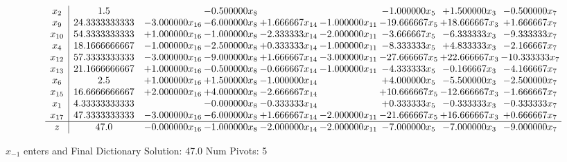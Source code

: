 \documentclass[10pt]{article}
\begin{document}
 \[\begin{array}{c| c c@{\hskip 2pt} c@{\hskip 2pt} c@{\hskip 2pt} c@{\hskip 2pt} c@{\hskip 2pt} c@{\hskip 2pt} c@{\hskip 2pt} }
 x_{2}   &  1.5  &   & -0.500000 x_{8} &    &   & -1.000000 x_{5} & + 1.500000 x_{3} & -0.500000 x_{7}\\
 x_{9}   &  24.3333333333 & -3.000000 x_{16} & -6.000000 x_{8} & + 1.666667 x_{14} & -1.000000 x_{11} & -19.666667 x_{5} & + 18.666667 x_{3} & + 1.666667 x_{7}\\
 x_{10}   &  54.3333333333 & + 1.000000 x_{16} & -1.000000 x_{8} & -2.333333 x_{14} & -2.000000 x_{11} & -3.666667 x_{5} & -6.333333 x_{3} & -9.333333 x_{7}\\
 x_{4}   &  18.1666666667 & -1.000000 x_{16} & -2.500000 x_{8} & + 0.333333 x_{14} & -1.000000 x_{11} & -8.333333 x_{5} & + 4.833333 x_{3} & -2.166667 x_{7}\\
 x_{12}   &  57.3333333333 & -3.000000 x_{16} & -9.000000 x_{8} & + 1.666667 x_{14} & -3.000000 x_{11} & -27.666667 x_{5} & + 22.666667 x_{3} & -10.333333 x_{7}\\
 x_{13}   &  21.1666666667 & + 1.000000 x_{16} & -0.500000 x_{8} & -0.666667 x_{14} & -1.000000 x_{11} & -4.333333 x_{5} & -0.166667 x_{3} & -4.166667 x_{7}\\
 x_{6}   &  2.5 & + 1.000000 x_{16} & + 1.500000 x_{8} & -1.000000 x_{14} &   & + 4.000000 x_{5} & -5.500000 x_{3} & -2.500000 x_{7}\\
 x_{15}   &  16.6666666667 & + 2.000000 x_{16} & + 4.000000 x_{8} & -2.666667 x_{14} &   & + 10.666667 x_{5} & -12.666667 x_{3} & -1.666667 x_{7}\\
 x_{1}   &  4.33333333333  &   & -0.000000 x_{8} & -0.333333 x_{14} &   & + 0.333333 x_{5} & -0.333333 x_{3} & -0.333333 x_{7}\\
 x_{17}   &  47.3333333333 & -3.000000 x_{16} & -6.000000 x_{8} & + 1.666667 x_{14} & -2.000000 x_{11} & -21.666667 x_{5} & + 16.666667 x_{3} & + 0.666667 x_{7}\\
\hline
z    &  47.0 & -0.000000 x_{16} & -1.000000 x_{8} & -2.000000 x_{14} & -2.000000 x_{11} & -7.000000 x_{5} & -7.000000 x_{3} & -9.000000 x_{7}\\
\end{array}\]


 $ x_{-1} $ enters and Final Dictionary
Solution:  47.0
Num Pivots:  5
\end{document}
